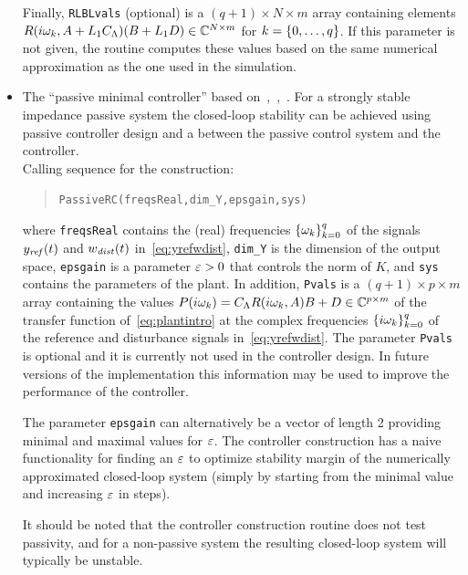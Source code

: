 \documentclass[11pt, a4paper]{amsart}
\newcommand{\COMMapproxRC}[1]{{\color{gray}#1}}
\renewcommand{\COMMapproxRC}[1]{}
\newcommand{\CL}{C_\Lambda}
\theoremstyle{definition}
\numberwithin{equation}{section}
\newcommand{\yref}{y_{\mbox{\scriptsize\textit{ref}}}}
\newcommand{\wdist}{w_{\mbox{\scriptsize\textit{dist}}}}
\begin{document}
\begin{itemize}
     Finally, \texttt{RLBLvals} (optional) is a $(q+1)\times N\times m$ array containing elements $R(i\gw_k,A+L_1\CL)(B+L_1D)\in \C^{N\times m}$ for $k=\List[0]{q}$. If this parameter is not given, the routine computes these values based on the same numerical approximation as the one used in the simulation.


  \item The ``passive minimal controller'' based on~,~,~\cite{PauLeGLHMNC18}. For a strongly stable impedance passive system the closed-loop stability can be achieved using passive controller design and a  between the passive control system and the controller.\\[1ex]
      Calling sequence for the construction:\\[-1ex]
     \begin{quotation}
	 \texttt{PassiveRC(freqsReal,dim\_Y,epsgain,sys)}
     \end{quotation}
     \medskip
     where
     \texttt{freqsReal} contains the (real) frequencies $\set{\gw_k}_{k=0}^q$ of the signals $\yref(t)$ and $\wdist(t)$ in~\eqref{eq:yrefwdist}, \texttt{dim\_Y} is the dimension of the output space, \texttt{epsgain} is a parameter $\eps>0$ that controls the norm of $K$,
     and \texttt{sys} contains the parameters of the plant.
     In addition, \texttt{Pvals} is a $(q+1)\times p\times m$ array containing the values $P(i\gw_k)=\CL R(i\gw_k,A)B+D\in \C^{p\times m}$ of the transfer function of~\eqref{eq:plantintro} at the complex frequencies $\set{i\gw_k}_{k=0}^q$ of the reference and disturbance signals in~\eqref{eq:yrefwdist}. The parameter \texttt{Pvals} is optional and it is currently not used in the controller design.
     In future versions of the implementation this information may be used to improve the performance of the controller.

The parameter \texttt{epsgain} can alternatively be a vector of length 2 providing minimal and maximal values for $\eps$. The controller construction has a naive functionality for finding an $\eps$ to optimize stability margin of the numerically approximated closed-loop system (simply by starting from the minimal value and increasing $\eps$ in steps). 

It should be noted that the controller construction routine does not test passivity, and for a non-passive system the resulting closed-loop system will typically be unstable.


     \COMMapproxRC{
     \item An ``approximate robust controller'' based on the reference~\cite{HumKur18} for finite-dimensional approximate control design for systems with infinite-dimensional output spaces.\\[1ex]
	 Calling sequence for the construction:\\[-1ex]
	   \begin{quotation}
	     \texttt{ApproximateRC(\dots)}
	   \end{quotation}
	 }
\end{itemize}
\end{document}
